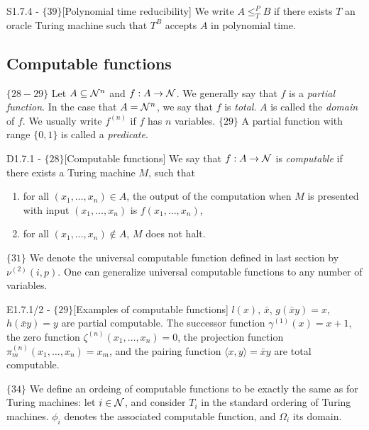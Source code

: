 \documentclass{article}
\begin{document}
\begin{flexitheorem}{S1.7.4 - $\{39\}$}[Polynomial time reducibility]
    We write $A \leq_T^P B$ if there exists $T$ an oracle Turing machine such that $T^B$ accepts $A$ in polynomial time.
\end{flexitheorem}

\subsection{Computable functions}

$\{28-29\}$ Let $A \subseteq \mathcal{N}^n$ and $f : A \to \mathcal{N}$. We generally say that $f$ is a \textit{partial function}. In the case that $A = \mathcal{N}^n$, we say that $f$ is \textit{total}. $A$ is called the \textit{domain} of $f$. We usually write $f^{(n)}$ if $f$ has $n$ variables. $\{29\}$ A partial function with range $\{0,1\}$ is called a \textit{predicate}.

\begin{flexidefinition}{D1.7.1 - $\{28\}$}[Computable functions]
    We say that $f : A \to \mathcal{N}$ is \textit{computable} if there exists a Turing machine $M$, such that 
\begin{enumerate}
    \item for all $(x_1, \ldots, x_n)\in A$, the output of the computation when $M$ is presented with input $(x_1,\ldots,x_n)$ is $f(x_1,\ldots,x_n)$,
    \item for all $(x_1, \ldots, x_n)\notin A$, $M$ does not halt.
\end{enumerate}
\end{flexidefinition}

$\{31\}$ We denote the universal computable function defined in last section by $\nu^{(2)}(i,p)$. One can generalize universal computable functions to any number of variables.

\begin{flexilemma} {E1.7.1/2 - $\{29\}$}[Examples of computable functions]
    $l(x)$, $\bar x$, $g(\bar x y) = x$, $h(\bar x y) = y$ are partial computable. The successor function $\gamma^{(1)}(x) = x +1$, the zero function $\zeta^{(n)}(x_1,\ldots,x_n) = 0$, the projection function $\pi^{(n)}_m(x_1,\ldots,x_n) = x_m$, and the pairing function $\langle x,y\rangle = \bar x y$ are total computable.
\end{flexilemma}

$\{34\}$ We define an ordeing of computable functions to be exactly the same as for Turing machines: let $i \in \mathcal{N}$, and consider $T_i$ in the standard ordering of Turing machines. $\phi_i$ denotes the associated computable function, and $\Omega_i$ its domain.
\end{document}
